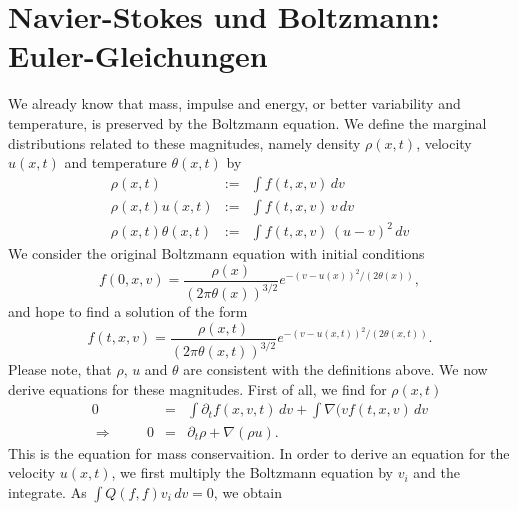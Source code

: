 



\section{Navier-Stokes und Boltzmann: Euler-Gleichungen}
\label{boltzxx}
We already know that mass, impulse and energy, or better variability and temperature, 
is preserved by the Boltzmann equation. We define the
marginal distributions related to these magnitudes, namely density $\rho(x,t)$, velocity $u(x,t)$ and temperature $\theta(x,t)$ by
\begin{eqnarray*}
\rho(x,t) & := & \int f(t,x,v)\, dv\\
\rho(x,t) u(x,t)     & := &  \int f(t,x,v)\,v\, dv\\
\rho(x,t)\theta(x,t) & := & \int f(t,x,v)\,(u-v)^2\, dv
\end{eqnarray*}
We consider the original Boltzmann equation with initial conditions
$$ f(0,x,v) = \frac{\rho(x)}{(2\pi\theta(x))^{3/2}} e^{-(v-u(x))^2/(2\theta(x))},$$
and hope to find a solution of the form
$$ f(t,x,v) = \frac{\rho(x,t)}{(2\pi\theta(x,t))^{3/2}} e^{-(v-u(x,t))^2/(2\theta(x,t))}.$$
Please note, that  $\rho$, $u$ and $\theta$ are consistent with the definitions above. 
We now derive equations for these magnitudes. 
First of all, we find for $\rho(x,t)$
\begin{eqnarray*}
0 & = & \int \partial_t f(x,v,t)\, dv + \int \nabla (vf(t,x,v)\, dv  \\
\Rightarrow\hspace{1cm} 0 & = & \partial_t \rho + \nabla(\rho u).
\end{eqnarray*}
This is the equation for mass conservaition. 
In order to derive an equation  for the velocity $u(x,t)$, we first multiply the Boltzmann equation by $v_i$ and the integrate. As
$\int Q(f,f) v_i\, dv = 0$, we obtain
